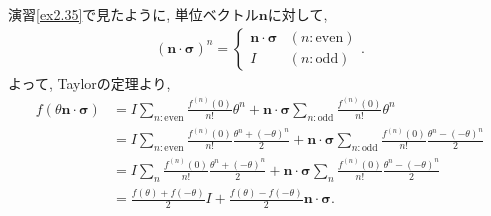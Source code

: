 \begin{problem}
\label{problem2.1}
演習\ref{ex2.35}で見たように, 単位ベクトル$\bm{n}$に対して,
\begin{align*}
    \left(\bm{n} \cdot \bm{\sigma} \right)^n =
    \begin{cases}
        \bm{n} \cdot \bm{\sigma} & (n: \mathrm{even} ) \\
        I                        & (n: \mathrm{odd} )
    \end{cases}.
\end{align*}
よって, Taylorの定理より,
\begin{align*}
    f(\theta \bm{n} \cdot \bm{\sigma} )
     & =
    I \sum_{n: \mathrm{even}} \frac{f^{(n)}(0)}{n!} \theta^n
    +
    \bm{n} \cdot \bm{\sigma} \sum_{n: \mathrm{odd}} \frac{f^{(n)}(0)}{n!} \theta^n
    \\
     & =
    I \sum_{n: \mathrm{even}} \frac{f^{(n)}(0)}{n!} \frac{\theta^n + (-\theta)^n}{2}
    +
    \bm{n} \cdot \bm{\sigma} \sum_{n: \mathrm{odd}} \frac{f^{(n)}(0)}{n!} \frac{\theta^n - (-\theta)^n}{2}
    \\
     & =
    I \sum_{n} \frac{f^{(n)}(0)}{n!} \frac{\theta^n + (-\theta)^n}{2}
    +
    \bm{n} \cdot \bm{\sigma} \sum_{n} \frac{f^{(n)}(0)}{n!} \frac{\theta^n - (-\theta)^n}{2}
    \\
     & =
    \frac{f(\theta) + f(-\theta)}{2} I + \frac{f(\theta) - f(-\theta)}{2}\bm{n} \cdot \bm{\sigma}.
\end{align*}
\end{problem}

